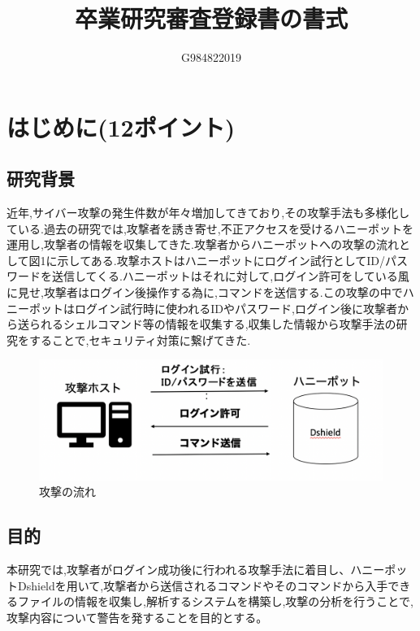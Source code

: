 \documentclass{entry}
\title{卒業研究審査登録書の書式}
\author{G984822019}{吉村　直将}
\begin{document}
\maketitle

\section{はじめに(12ポイント)}
\subsection{研究背景}
近年,サイバー攻撃の発生件数が年々増加してきており,その攻撃手法も多様化している.過去の研究では,攻撃者を誘き寄せ,不正アクセスを受けるハニーポットを運用し,攻撃者の情報を収集してきた.攻撃者からハニーポットへの攻撃の流れとして図1に示してある.攻撃ホストはハニーポットにログイン試行としてID/パスワードを送信してくる.ハニーポットはそれに対して,ログイン許可をしている風に見せ,攻撃者はログイン後操作する為に,コマンドを送信する.この攻撃の中でハニーポットはログイン試行時に使われるIDやパスワード,ログイン後に攻撃者から送られるシェルコマンド等の情報を収集する,収集した情報から攻撃手法の研究をすることで,セキュリティ対策に繋げてきた.　
\begin{figure}[htbp]
	\centering
	\includegraphics[width=\hsize]{honeypot.png}
	\caption{攻撃の流れ}
\end{figure}
\subsection{目的}
本研究では,攻撃者がログイン成功後に行われる攻撃手法に着目し、ハニーポットDshieldを用いて,攻撃者から送信されるコマンドやそのコマンドから入手できるファイルの情報を収集し,解析するシステムを構築し,攻撃の分析を行うことで,攻撃内容について警告を発することを目的とする。
\end{document}
